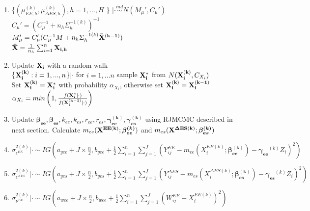 \documentclass[11pt]{article}\usepackage[]{graphicx}\usepackage[]{color}
\begin{document}
\begin{enumerate}
\begin{enumerate}
\item
 \{$(\mu_{EE,h}^{(k)},\mu_{\Delta ES,h}^{(k)}), h=1,...,H$ \} $|\cdot \overset{ind}{\sim} N(M_{\mu}',C_{\mu}')$ \\
$C_{\mu}' = (C_{\mu}^{-1} + n_h \Sigma_{h}^{-1(k)})^{-1}$ \\
$M_{\mu}' = C_{\mu}'(C_{\mu}^{-1}M + n_h \Sigma_{h}^{-1(k)} {\bf \bar{X}^{(k-1)}})$ \\
${\bf \bar{X}} = \frac{1}{n_h}\sum_{i=1}^{n} {\bf X_{i,h}}$ \\

 

\item
Update ${\bf X_i}$ with a random walk \\
\{${\bf X_i^{(k)}}:i=1,...,n $\}$|\cdot$ for $i=1,...n$ sample ${\bf X_i^*}$ from $N({\bf X_i^{(k)}},C_{X_i})$ \\

Set ${\bf X_i^{(k)}} = {\bf X_i^*}$ with probability $\alpha_{X_i}$, otherwise set ${\bf X_i^{(k)}} = {\bf X_i^{(k-1)}}$ \\

$\alpha_{X_i} = min\left(1, \frac{f({\bf X_i^*}|\cdot)}{f({\bf X_i^{(k-1)}}|\cdot)}  \right)$ \\

\item
Update ${\boldsymbol{\beta_{ee}},\boldsymbol{\beta_{es}}},k_{ee},k_{es}, {  r_{ee}, r_{es}}, \boldsymbol{\gamma_{ee}^{(k)}}, \boldsymbol{\gamma_{es}^{(k)}}$ using RJMCMC described in next section. Calculate $m_{ee}({\bf X^{EE(k)}};\boldsymbol{\beta_{ee}^{(k)}})$ and $m_{es}({\bf X^{\Delta ES(k)}};\boldsymbol{\beta_{es}^{(k)}})$ \\

\item
 $\sigma^{2(k)}_{\epsilon^{EE}} |\cdot \sim IG(a_{yee}+J\times \frac{n}{2},b_{yee}+\frac{1}{2}\sum_{i=1}^{n}\sum_{j=1}^{J}(Y_{ij}^{EE}-m_{ee}(X_i^{EE(k)};\boldsymbol{\beta_{ee}^{(k)}})-\boldsymbol{\gamma_{ee}}^{(k)}Z_i)^2)$ \\
 

\item
 $\sigma^{2(k)}_{\epsilon^{\Delta ES}} |\cdot \sim IG(a_{yes}+J\times \frac{n}{2},b_{yes}+\frac{1}{2}\sum_{i=1}^{n}\sum_{j=1}^{J}(Y_{ij}^{\Delta ES}-m_{es}(X_i^{\Delta ES(k)};\boldsymbol{\beta_{es}^{(k)}})-\boldsymbol{\gamma_{es}}^{(k)}Z_i)^2)$ \\
 
 
\item
 $\sigma^{2(k)}_{\nu^{EE}} |\cdot \sim IG(a_{wee}+J\times \frac{n}{2},b_{wee}+\frac{1}{2}\sum_{i=1}^{n}\sum_{j=1}^{J}(W_{ij}^{EE}-X_i^{EE(k)})^2)$ \\
 

\end{enumerate}
\end{enumerate}
\end{document}
